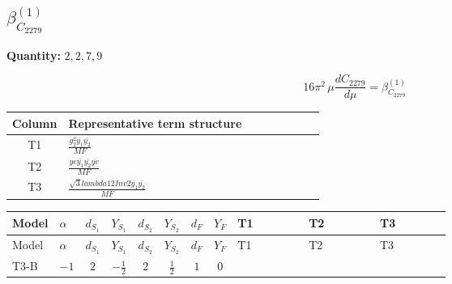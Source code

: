 \documentclass[8pt]{article}
\begin{document}
\begin{landscape}
\section*{$\beta_{C_{2279}}^{(1)}$}
\noindent\textbf{Quantity: }$\mathrm{2,2,7,9}$\par\smallskip
\[16\pi^2\,\mu\frac{d C_{2279}}{d\mu}=\beta_{C_{2279}}^{(1)}\]
\begin{center}
\begin{tabular}{@{}c >{\raggedright\arraybackslash}p{0.82\linewidth}@{}}
\toprule
Column & Representative term structure \\
\midrule
T1 & \(\displaystyle \frac{g_{2}^{2} \overline{y_{1}} \overline{y_{2}}}{MF}\) \\
\midrule
T2 & \(\displaystyle \frac{ye \overline{y_{1}} \overline{y_{2}} \overline{ye}}{MF}\) \\
\midrule
T3 & \(\displaystyle \frac{\sqrt{3} lambda12Inv2 \overline{y_{1}} \overline{y_{2}}}{MF}\) \\
\midrule
\bottomrule
\end{tabular}
\end{center}
\smallskip
\tiny
\begin{longtable}{@{}llcccccc >{\raggedright\arraybackslash}p{0.21\linewidth} >{\raggedright\arraybackslash}p{0.21\linewidth} >{\raggedright\arraybackslash}p{0.21\linewidth}@{}}
\toprule
Model & $\alpha$ & $d_{S_1}$ & $Y_{S_1}$ & $d_{S_2}$ & $Y_{S_2}$ & $d_F$ & $Y_F$ & T1 & T2 & T3 \\
\midrule
\endfirsthead
\toprule
Model & $\alpha$ & $d_{S_1}$ & $Y_{S_1}$ & $d_{S_2}$ & $Y_{S_2}$ & $d_F$ & $Y_F$ & T1 & T2 & T3 \\
\midrule
\endhead
T3-B & $-1$ & $2$ & $-\frac{1}{2}$ & $2$ & $\frac{1}{2}$ & $1$ & $0$ & \scriptsize\adjustbox{max width=\linewidth}{$\begin{gathered} \frac{3 g_{2}^{2} \overline{y_{1}} \overline{y_{2}}}{4 MF}\end{gathered}$} & \scriptsize\adjustbox{max width=\linewidth}{$\begin{gathered} - \frac{ye \overline{y_{1}} \overline{y_{2}} \overline{ye}}{4 MF}\end{gathered}$} & \scriptsize\adjustbox{max width=\linewidth}{$\begin{gathered} \frac{\sqrt{3} lambda12Inv2 \overline{y_{1}} \overline{y_{2}}}{3 MF}\end{gathered}$} \\
\midrule
\bottomrule
\end{longtable}
\clearpage

\end{landscape}
\end{document}
